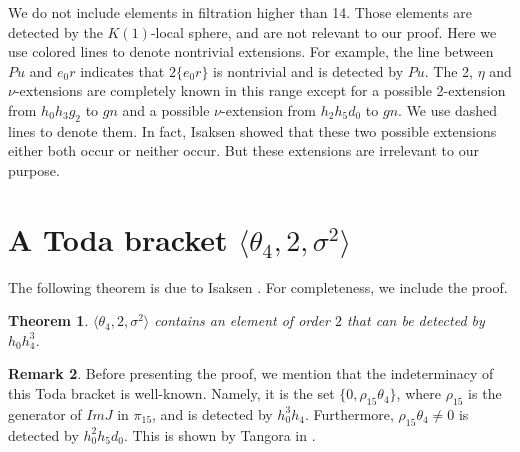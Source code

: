 \documentclass[psamsfonts]{amsart}
\newtheorem{thm}{Theorem}[section]
\theoremstyle{definition}
\newtheorem{rem}[thm]{Remark}
\numberwithin{equation}{section}
\begin{document}
 \pagebreak




We do not include elements in filtration higher than 14. Those elements are detected by the $K(1)$-local sphere, and are not relevant to our proof. Here we use colored lines to denote nontrivial extensions. For example, the line between $Pu$ and $e_0r$ indicates that $2\{e_0r\}$ is nontrivial and is detected by $Pu$. The 2, $\eta$ and $\nu$-extensions are completely known in this range except for a possible 2-extension from $h_0h_3g_2$ to $gn$ and a possible $\nu$-extension from $h_2h_5d_0$ to $gn$. We use dashed lines to denote them. In fact, Isaksen \cite{DI1} showed that these two possible extensions either both occur or neither occur. But these extensions are irrelevant to our purpose.

\section{A Toda bracket $\langle \theta_4, 2, \sigma^2\rangle$}

The following theorem is due to Isaksen \cite{DI1}. For completeness, we include the proof.

\begin{thm}
$\langle \theta_4, 2, \sigma^2\rangle$ contains an element of order $2$ that can be detected by $h_0h_4^3$.
\end{thm}

\begin{rem}
Before presenting the proof, we mention that the indeterminacy of this Toda bracket is well-known. Namely, it is the set $\{0, \rho_{15}\theta_4\}$, where $\rho_{15}$ is the generator of $ImJ$ in $\pi_{15}$, and is detected by $h_0^3h_4$. Furthermore, $\rho_{15}\theta_4\neq 0$ is detected by $h_0^2h_5d_0$. This is shown by Tangora in \cite{Tan}.
\end{rem}
\end{document}
